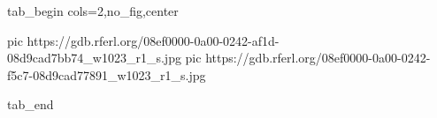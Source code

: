  
 
 
 
 

\ifcmt
  tab_begin cols=2,no_fig,center

     pic https://gdb.rferl.org/08ef0000-0a00-0242-af1d-08d9cad7bb74_w1023_r1_s.jpg
		 pic https://gdb.rferl.org/08ef0000-0a00-0242-f5c7-08d9cad77891_w1023_r1_s.jpg

  tab_end
\fi
